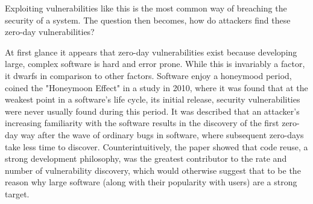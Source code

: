 \documentclass[a4paper, 11pt]{article}
\begin{document}
Exploiting vulnerabilities like this is the most common way of breaching the security of a system. \cite{ref:biometricattackvectors,ref:ibmbiometrics,ref:honeymoonsoftware} The question then becomes, how do attackers find these zero-day vulnerabilities?

At first glance it appears that zero-day vulnerabilities exist because developing large, complex software is hard and error prone. While this is invariably a factor, it dwarfs in comparison to other factors. Software enjoy a honeymood period, \cite{ref:honeymoonsoftware} coined the "Honeymoon Effect" in a study in 2010, where it was found that at the weakest point in a software's life cycle, its initial release, security vulnerabilities were never usually found during this period. It was described that an attacker's increasing familiarity with the software results in the discovery of the first zero-day way after the wave of ordinary bugs in software, where subsequent zero-days take less time to discover. Counterintuitively, the paper showed that code reuse, a strong development philosophy, was the greatest contributor to the rate and number of vulnerability discovery, which would otherwise suggest that to be the reason why large software (along with their popularity with users) are a strong target.
\end{document}
